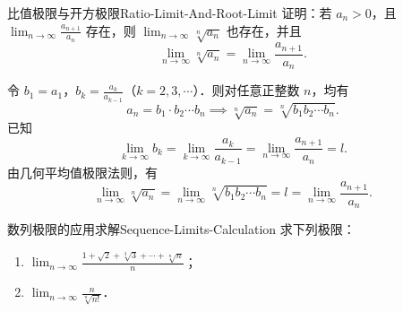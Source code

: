 \begin{problem}{比值极限与开方极限}{Ratio-Limit-And-Root-Limit}
    证明：若 $a_n > 0$，且 $\lim_{n\to\infty} \frac{a_{n+1}}{a_n}$ 存在，则 $\lim_{n\to\infty} \sqrt[n]{a_n}$ 也存在，并且
    \begin{equation}
        \lim_{n\to\infty} \sqrt[n]{a_n} = \lim_{n\to\infty} \frac{a_{n+1}}{a_n}.
    \end{equation}
\end{problem}

\begin{myproof}
    令 $b_1 = a_1$，$b_k = \frac{a_k}{a_{k-1}}$（$k = 2, 3, \cdots$）．则对任意正整数 $n$，均有
    \begin{equation}
        a_n = b_1 \cdot b_2 \cdots b_n \implies \sqrt[n]{a_n} = \sqrt[n]{b_1 b_2 \cdots b_n}.
    \end{equation}
    已知
    \begin{equation}
        \lim_{k\to\infty} b_k = \lim_{k\to\infty} \frac{a_k}{a_{k-1}} = \lim_{n\to\infty} \frac{a_{n+1}}{a_n} = l.
    \end{equation}
    由几何平均值极限法则，有
    \begin{equation}
        \lim_{n\to\infty} \sqrt[n]{a_n} = \lim_{n\to\infty} \sqrt[n]{b_1 b_2 \cdots b_n} = l = \lim_{n\to\infty} \frac{a_{n+1}}{a_n}.
    \end{equation}
\end{myproof}

\begin{problem}{数列极限的应用求解}{Sequence-Limits-Calculation}
    求下列极限：
    \begin{enumerate}
        \item $\lim_{n\to\infty} \frac{1 + \sqrt{2} + \sqrt[3]{3} + \cdots + \sqrt[n]{n}}{n}$；
        \item $\lim_{n\to\infty} \frac{n}{\sqrt[n]{n!}}$．
    \end{enumerate}
\end{problem}

